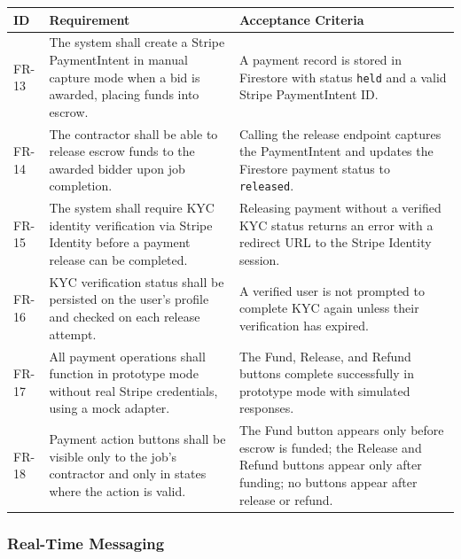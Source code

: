 \documentclass[11pt]{article}
\begin{document}
\begin{longtable}{@{}p{1.8cm}p{5.8cm}p{5.8cm}@{}}
\toprule
\textbf{ID} & \textbf{Requirement} & \textbf{Acceptance Criteria} \\
\midrule
\endhead
FR-13 & The system shall create a Stripe PaymentIntent in manual capture mode when a bid is awarded, placing funds into escrow. & A payment record is stored in Firestore with status \texttt{held} and a valid Stripe PaymentIntent ID. \\
\midrule
FR-14 & The contractor shall be able to release escrow funds to the awarded bidder upon job completion. & Calling the release endpoint captures the PaymentIntent and updates the Firestore payment status to \texttt{released}. \\
\midrule
FR-15 & The system shall require KYC identity verification via Stripe Identity before a payment release can be completed. & Releasing payment without a verified KYC status returns an error with a redirect URL to the Stripe Identity session. \\
\midrule
FR-16 & KYC verification status shall be persisted on the user's profile and checked on each release attempt. & A verified user is not prompted to complete KYC again unless their verification has expired. \\
\midrule
FR-17 & All payment operations shall function in prototype mode without real Stripe credentials, using a mock adapter. & The Fund, Release, and Refund buttons complete successfully in prototype mode with simulated responses. \\
\midrule
FR-18 & Payment action buttons shall be visible only to the job's contractor and only in states where the action is valid. & The Fund button appears only before escrow is funded; the Release and Refund buttons appear only after funding; no buttons appear after release or refund. \\
\bottomrule
\end{longtable}

\subsubsection{Real-Time Messaging}
\end{document}
